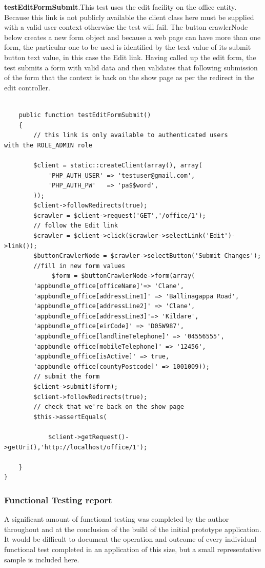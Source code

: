 \documentclass[a4paper,Times New Roman 11pt]{article}
\begin{document}
\textbf{testEditFormSubmit}.This test uses the edit facility on the office entity. Because this link is not publicly available the client class here must be supplied with a valid user context otherwise the test will fail.
The button crawlerNode below creates a new form object and because a web page can have more than one form, the particular one to be used is identified by the text value of its submit button text value, in this case the Edit link.
Having called up the edit form, the test submits a form with valid data and then validates that following submission of the form that the context is back on the show page as per the redirect in the edit controller.
\begin{verbatim}

    public function testEditFormSubmit()
    {
        // this link is only available to authenticated users 
with the ROLE_ADMIN role

        $client = static::createClient(array(), array(
            'PHP_AUTH_USER' => 'testuser@gmail.com',
            'PHP_AUTH_PW'   => 'pa$$word',
        ));
        $client->followRedirects(true);
        $crawler = $client->request('GET','/office/1');
        // follow the Edit link
        $crawler = $client->click($crawler->selectLink('Edit')->link());
        $buttonCrawlerNode = $crawler->selectButton('Submit Changes');
        //fill in new form values
             $form = $buttonCrawlerNode->form(array(
        'appbundle_office[officeName]'=> 'Clane',
        'appbundle_office[addressLine1]' => 'Ballinagappa Road',
        'appbundle_office[addressLine2]' => 'Clane',
        'appbundle_office[addressLine3]'=> 'Kildare',
        'appbundle_office[eirCode]' => 'D05W987',
        'appbundle_office[landlineTelephone]' => '04556555',
        'appbundle_office[mobileTelephone]' => '12456',
        'appbundle_office[isActive]' => true,
        'appbundle_office[countyPostcode]' => 1001009));
        // submit the form
        $client->submit($form);
        $client->followRedirects(true);
        // check that we're back on the show page
        $this->assertEquals(

            $client->getRequest()->getUri(),'http://localhost/office/1');

    }
}
\end{verbatim}
\subsubsection{Functional Testing report}
A  significant amount of functional testing was completed by the author throughout and at the conclusion of the build of the initial prototype application. It would be difficult to document the operation and outcome of every individual functional test completed in an application of this size, but a small representative sample is included here.
\end{document}
